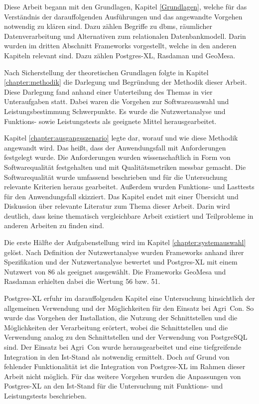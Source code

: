 Diese Arbeit begann mit den Grundlagen, Kapitel \ref{Grundlagen}, welche für das Verständnis der darauffolgenden Ausführungen und das angewandte Vorgehen notwendig zu klären sind.
Dazu zählen Begriffe zu \Gls{dbms}, räumlicher Datenverarbeitung und Alternativen zum relationalen Datenbankmodell.
Darin wurden im dritten Abschnitt Frameworks vorgestellt, welche in den anderen Kapiteln relevant sind.
Dazu zählen Postgres-XL, Rasdaman und GeoMesa.

Nach Sicherstellung der theoretischen Grundlagen folgte in Kapitel \ref{chapter:methodik} die Darlegung und Begründung der Methodik dieser Arbeit.
Diese Darlegung fand anhand einer Unterteilung des Themas in vier Unteraufgaben statt.
Dabei waren die Vorgehen zur Softwareauswahl und Leistungsbestimmung Schwerpunkte.
Es wurde die Nutzwertanalyse und Funktions- sowie Leistungstests als geeignete Mittel herausgearbeitet.

Kapitel \ref{chapter:ausgangsszenario} legte dar, worauf und wie diese Methodik angewandt wird.
Das heißt, dass der Anwendungsfall mit Anforderungen festgelegt wurde.
Die Anforderungen wurden wissenschaftlich in Form von Softwarequalität festgehalten und mit Qualitätsmetriken messbar gemacht.
Die Softwarequalität wurde umfassend beschrieben und für die Untersuchung relevante Kriterien heraus gearbeitet.
Außerdem wurden Funktions- und Lasttests für den Anwendungsfall skizziert.
Das Kapitel endet mit einer Übersicht und Diskussion über relevante Literatur zum Thema dieser Arbeit.
Darin wird deutlich, dass keine thematisch vergleichbare Arbeit existiert und Teilprobleme in anderen Arbeiten zu finden sind.

Die erste Hälfte der Aufgabenstellung wird im Kapitel \ref{chapter:systemauswahl} gelöst.
Nach Definition der Nutzwertanalyse wurden Frameworks anhand ihrer Spezifikation und der Nutzwertanalyse bewertet und Postgres-XL mit einem Nutzwert von 86 als geeignet ausgewählt.
Die Frameworks GeoMesa und Rasdaman erhielten dabei die Wertung 56 bzw. 51.

Postgres-XL erfuhr im darauffolgenden Kapitel eine Untersuchung hinsichtlich der allgemeinen Verwendung und der Möglichkeiten für den Einsatz bei Agri~Con.
So wurde das Vorgehen der Installation, die Nutzung der Schnittstellen und die Möglichkeiten der Verarbeitung erörtert, wobei die Schnittstellen und die Verwendung analog zu den Schnittstellen und der Verwendung von PostgreSQL sind.
Der Einsatz bei Agri~Con wurde herausgearbeitet und eine tiefgreifende Integration in den Ist-Stand als notwendig ermittelt.
Doch auf Grund von fehlender Funktionalität ist die Integration von Postgres-XL im Rahmen dieser Arbeit nicht möglich.
Für das weitere Vorgehen wurden die Anpassungen von Postgres-XL an den Ist-Stand für die Untersuchung mit Funktions- und Leistungstests beschrieben.

